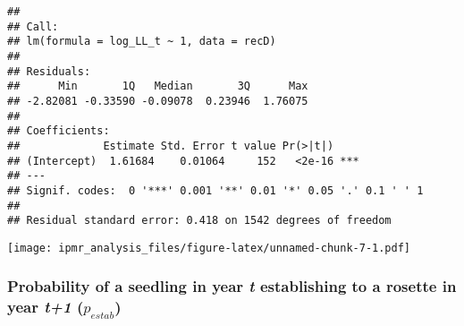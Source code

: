 \documentclass[
]{article}
\newenvironment{Shaded}{\begin{snugshade}}{\end{snugshade}}
\newcommand{\AttributeTok}[1]{\textcolor[rgb]{0.77,0.63,0.00}{#1}}
\newcommand{\DecValTok}[1]{\textcolor[rgb]{0.00,0.00,0.81}{#1}}
\newcommand{\FunctionTok}[1]{\textcolor[rgb]{0.00,0.00,0.00}{#1}}
\newcommand{\NormalTok}[1]{#1}
\newcommand{\SpecialCharTok}[1]{\textcolor[rgb]{0.00,0.00,0.00}{#1}}
\newcommand{\StringTok}[1]{\textcolor[rgb]{0.31,0.60,0.02}{#1}}
\begin{document}
\begin{verbatim}
## 
## Call:
## lm(formula = log_LL_t ~ 1, data = recD)
## 
## Residuals:
##      Min       1Q   Median       3Q      Max 
## -2.82081 -0.33590 -0.09078  0.23946  1.76075 
## 
## Coefficients:
##             Estimate Std. Error t value Pr(>|t|)    
## (Intercept)  1.61684    0.01064     152   <2e-16 ***
## ---
## Signif. codes:  0 '***' 0.001 '**' 0.01 '*' 0.05 '.' 0.1 ' ' 1
## 
## Residual standard error: 0.418 on 1542 degrees of freedom
\end{verbatim}

\begin{Shaded}
\end{Shaded}

\texttt{[image: ipmr\_analysis\_files/figure-latex/unnamed-chunk-7-1.pdf]}

\hypertarget{probability-of-a-seedling-in-year-t-establishing-to-a-rosette-in-year-t1-p_estab}{%
\subsubsection{\texorpdfstring{Probability of a seedling in year
\emph{t} establishing to a rosette in year \emph{t+1}
(\(p_{estab}\))}{Probability of a seedling in year t establishing to a rosette in year t+1 (p\_\{estab\})}}\label{probability-of-a-seedling-in-year-t-establishing-to-a-rosette-in-year-t1-p_estab}}
\end{document}

